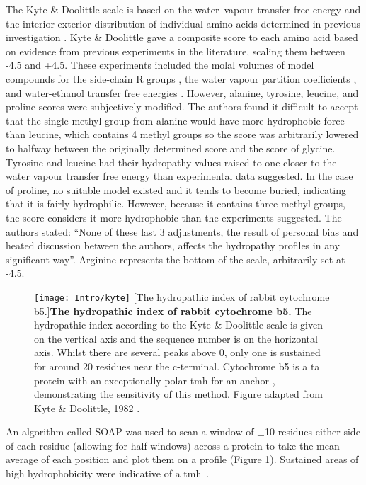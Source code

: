 The Kyte \& Doolittle scale \cite{Kyte1982} is based on the water\---vapour transfer free energy and the interior-exterior distribution of individual amino acids determined in previous investigation \cite{Chothia1976}.
Kyte \& Doolittle gave a composite score to each amino acid based on evidence from previous experiments in the literature, scaling them between -4.5 and +4.5.
These experiments included the molal volumes of model compounds for the side\--chain R groups \cite{Wolfenden1979, Cohn1934, Traube1899}, the water vapour partition coefficients \cite{Hine1975, Wolfenden1979}, and water\--ethanol transfer free energies \cite{Cohn1943, Nozaki1971}.
However, alanine, tyrosine, leucine, and proline scores were subjectively modified.
The authors found it difficult to accept that the single methyl group from alanine would have more hydrophobic force than leucine, which contains 4 methyl groups so the score was arbitrarily lowered to halfway between the originally determined score and the score of glycine.
Tyrosine and leucine had their hydropathy values raised to one closer to the water vapour transfer free energy than experimental data suggested.
In the case of proline, no suitable model existed and it tends to become buried, indicating that it is fairly hydrophilic.
However, because it contains three methyl groups, the score considers it more hydrophobic than the experiments suggested.
The authors stated: ``None of these last 3 adjustments, the result of personal bias and heated discussion between the authors, affects the hydropathy profiles in any significant way''\cite{Kyte1982}.
Arginine represents the bottom of the scale, arbitrarily set at -4.5.

\begin{figure}[ht]
\centering
\texttt{[image: Intro/kyte]}
		[The hydropathic index of rabbit cytochrome b5.]{\textbf{The hydropathic index of rabbit cytochrome b5.}
		The hydropathic index according to the Kyte \& Doolittle scale \cite{Kyte1982} is given on the vertical axis and the sequence number is on the horizontal axis.
		Whilst there are several peaks above 0, only one is sustained for around 20 residues near the c\--terminal.
		Cytochrome b5 is a \gls{ta} protein with an exceptionally polar \gls{tmh} for an anchor \cite{Brambillasca2006}, demonstrating the sensitivity of this method.
		Figure adapted from Kyte \& Doolittle, 1982 \cite{Kyte1982}.
		}
\label{fig:kyte}
\end{figure}

An algorithm called SOAP was used to scan a window of $\pm$10 residues either side of each residue (allowing for half windows) across a protein to take the mean average of each position and plot them on a profile (Figure \ref{fig:kyte}).
Sustained areas of high hydrophobicity were indicative of a \gls{tmh}~\cite{Kyte1982}.

